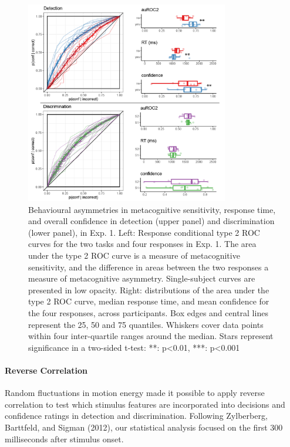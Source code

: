 \documentclass[
  english,
  man]{apa6}
\let\oldparagraph\paragraph
\renewcommand{\paragraph}[1]{\oldparagraph{#1}\mbox{}}
\begin{document}
\begin{figure}
\includegraphics[width=3.49in]{figures/RC-exp1-asymmetries-enhanced} \caption[Behavioural asymmetries in metacognitive sensitivity, response time, and overall confidence, in Exp. 1]{Behavioural asymmetries in metacognitive sensitivity, response time, and overall confidence in detection (upper panel) and discrimination (lower panel), in Exp. 1. Left: Response conditional type 2 ROC curves for the two tasks and four responses in Exp. 1. The area under the type 2 ROC curve is a measure of metacognitive sensitivity, and the difference in areas between the two responses a measure of metacognitive asymmetry. Single-subject curves are presented in low opacity. Right: distributions of the area under the type 2 ROC curve, median response time, and mean confidence for the four responses, across participants. Box edges and central lines represent the 25, 50 and 75 quantiles. Whiskers cover data points within four inter-quartile ranges around the median. Stars represent significance in a two-sided t-test: **: p\textless0.01, ***: p\textless0.001}\label{fig:RC-exp1-asymmetries}
\end{figure}

\hypertarget{reverse-correlation}{%
\paragraph{Reverse Correlation}\label{reverse-correlation}}

Random fluctuations in motion energy made it possible to apply reverse correlation to test which stimulus features are incorporated into decisions and confidence ratings in detection and discrimination. Following Zylberberg, Barttfeld, and Sigman (2012), our statistical analysis focused on the first 300 milliseconds after stimulus onset.
\end{document}
